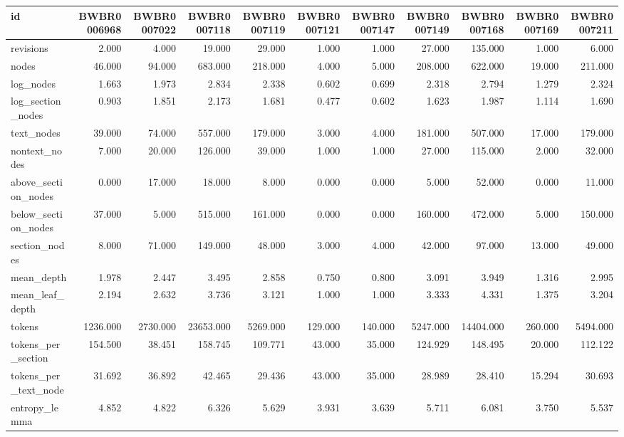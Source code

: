 \begin{tabular}{lrrrrrrrrrr}
\toprule
id & BWBR0006968 & BWBR0007022 & BWBR0007118 & BWBR0007119 & BWBR0007121 & BWBR0007147 & BWBR0007149 & BWBR0007168 & BWBR0007169 & BWBR0007211 \\
\midrule
revisions & 2.000 & 4.000 & 19.000 & 29.000 & 1.000 & 1.000 & 27.000 & 135.000 & 1.000 & 6.000 \\
\cline{1-11}
nodes & 46.000 & 94.000 & 683.000 & 218.000 & 4.000 & 5.000 & 208.000 & 622.000 & 19.000 & 211.000 \\
\cline{1-11}
log\_nodes & 1.663 & 1.973 & 2.834 & 2.338 & 0.602 & 0.699 & 2.318 & 2.794 & 1.279 & 2.324 \\
\cline{1-11}
log\_section\_nodes & 0.903 & 1.851 & 2.173 & 1.681 & 0.477 & 0.602 & 1.623 & 1.987 & 1.114 & 1.690 \\
\cline{1-11}
text\_nodes & 39.000 & 74.000 & 557.000 & 179.000 & 3.000 & 4.000 & 181.000 & 507.000 & 17.000 & 179.000 \\
\cline{1-11}
nontext\_nodes & 7.000 & 20.000 & 126.000 & 39.000 & 1.000 & 1.000 & 27.000 & 115.000 & 2.000 & 32.000 \\
\cline{1-11}
above\_section\_nodes & 0.000 & 17.000 & 18.000 & 8.000 & 0.000 & 0.000 & 5.000 & 52.000 & 0.000 & 11.000 \\
\cline{1-11}
below\_section\_nodes & 37.000 & 5.000 & 515.000 & 161.000 & 0.000 & 0.000 & 160.000 & 472.000 & 5.000 & 150.000 \\
\cline{1-11}
section\_nodes & 8.000 & 71.000 & 149.000 & 48.000 & 3.000 & 4.000 & 42.000 & 97.000 & 13.000 & 49.000 \\
\cline{1-11}
mean\_depth & 1.978 & 2.447 & 3.495 & 2.858 & 0.750 & 0.800 & 3.091 & 3.949 & 1.316 & 2.995 \\
\cline{1-11}
mean\_leaf\_depth & 2.194 & 2.632 & 3.736 & 3.121 & 1.000 & 1.000 & 3.333 & 4.331 & 1.375 & 3.204 \\
\cline{1-11}
tokens & 1236.000 & 2730.000 & 23653.000 & 5269.000 & 129.000 & 140.000 & 5247.000 & 14404.000 & 260.000 & 5494.000 \\
\cline{1-11}
tokens\_per\_section & 154.500 & 38.451 & 158.745 & 109.771 & 43.000 & 35.000 & 124.929 & 148.495 & 20.000 & 112.122 \\
\cline{1-11}
tokens\_per\_text\_node & 31.692 & 36.892 & 42.465 & 29.436 & 43.000 & 35.000 & 28.989 & 28.410 & 15.294 & 30.693 \\
\cline{1-11}
entropy\_lemma & 4.852 & 4.822 & 6.326 & 5.629 & 3.931 & 3.639 & 5.711 & 6.081 & 3.750 & 5.537 \\

\end{tabular}
